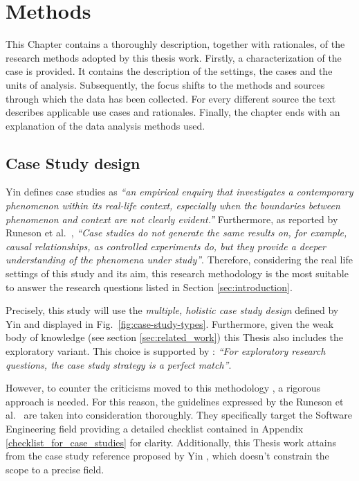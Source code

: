 \chapter{Methods} \label{methods}
This Chapter contains a thoroughly description, together with rationales, of the research methods adopted by this thesis work. Firstly, a characterization of the case is provided. It contains the description of the settings, the cases and the units of analysis. Subsequently, the focus shifts to the methods and sources through which the data has been collected. For every different source the text describes applicable use cases and rationales. Finally, the chapter ends with an explanation of the data analysis methods used.


%
%
%
%
\section{Case Study design}	\label{sec:case-description}
Yin \cite{case_study_guide} defines case studies as \textit{``an empirical enquiry that investigates a contemporary phenomenon within its real-life context, especially when the boundaries between phenomenon and context are not clearly evident.''}
Furthermore, as reported by Runeson et al.\ \cite[p.~3]{case_study_software_engineering}, \textit{``Case studies do not generate the same results on, for example, causal relationships, as controlled experiments do, but they provide a deeper understanding of the phenomena under study''}. Therefore, considering the real life settings of this study and its aim, this research methodology is the most suitable to answer the research questions listed in Section \ref{sec:introduction}.

Precisely, this study will use the \textit{multiple, holistic case study design} defined by Yin \cite{case_study_guide} and displayed in Fig.\ \ref{fig:case-study-types}. Furthermore, given the weak body of knowledge (see section \ref{sec:related_work}) this Thesis also includes the exploratory variant. This choice is supported by \cite[p.~19]{case_study_software_engineering}: \textit{``For exploratory research questions, the case study strategy is a perfect match''}.

However, to counter the criticisms moved to this methodology \cite[p.~4]{case_study_software_engineering}, a rigorous approach is needed. For this reason, the guidelines expressed by the Runeson et al.\ \cite{case_study_software_engineering} are taken into consideration thoroughly. They specifically target the Software Engineering field providing a detailed checklist contained in Appendix \ref{checklist_for_case_studies} for clarity. Additionally, this Thesis work attains from the case study reference proposed by Yin \cite{case_study_guide}, which doesn't constrain the scope to a precise field.

